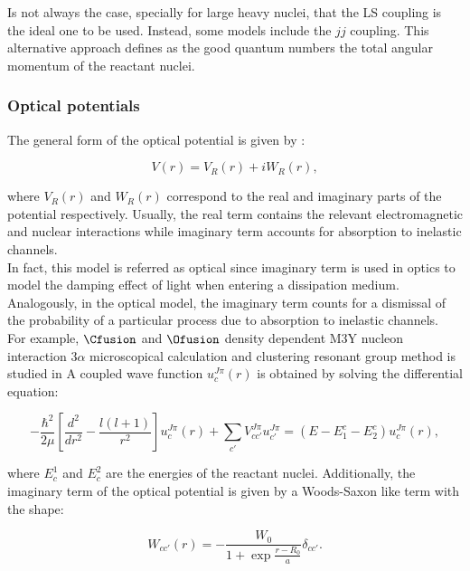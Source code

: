 \documentclass[openany]{book}
\begin{document}
Is not always the case, specially for large heavy nuclei, that the LS coupling is the ideal one to be used. Instead, some models include the $jj$ coupling. This alternative approach defines as the good quantum numbers the total angular momentum of the reactant nuclei.

\subsubsection{Optical potentials} \label{sub:potential_effective_optical}

The general form of the optical potential is given by \cite{amer_penionzhkevich_2021}:

\begin{equation}  \label{eq:potential_Optical}
	V(r) = V_R(r) + iW_R(r),
\end{equation}

where $V_R(r)$ and $W_R(r)$ correspond to the real and imaginary parts of the potential respectively. Usually, the real term contains the relevant electromagnetic and nuclear interactions while imaginary term accounts for absorption to inelastic channels. \\

In fact, this model is referred as optical since imaginary term is used in optics to model the damping effect of light when entering a dissipation medium. Analogously, in the optical model, the imaginary term counts for a dismissal of the probability of a particular process due to absorption to inelastic channels. \\

For example, $\Cfusion$ and $\Ofusion$ density dependent M3Y nucleon interaction $3\alpha$ microscopical calculation and clustering resonant group method is studied in \cite{assuncao_descouvemont_2015} A coupled wave function $u^{J\pi}_c(r)$ is obtained by solving the differential equation: 

\begin{equation}\label{eq:middleFusion_coupledChannels}
	- \frac{\hbar^2}{2\mu} \left[ \frac{d^2}{dr^2} - \frac{l(l+1)}{r^2}\right]u^{J\pi}_c(r) + \sum_{c'}{V^{J\pi}_{cc'} u^{J\pi}_{c'} } = (E - E^{c}_1 - E^{c}_2) u^{J\pi}_c(r),
\end{equation}

where $E^{1}_{c}$ and $E^{2}_{c}$ are the energies of the reactant nuclei. Additionally, the imaginary term of the optical potential is given by a Woods-Saxon like term with the shape:

\begin{equation}\label{eq:middleFusion_coupledChannels_opticalPotential}
	W_{cc'}(r) = - \frac{W_0}{1 + \exp { \frac{r - R_0}{a}}} \delta_{cc'}.
\end{equation}
\end{document}
